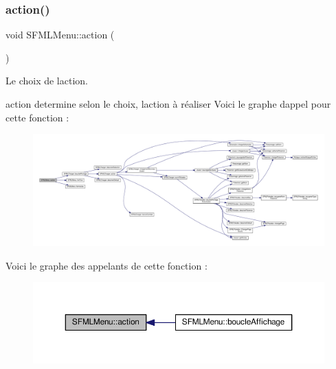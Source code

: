 \subsubsection{\texorpdfstring{action()}{action()}}
{\footnotesize\ttfamily void S\+F\+M\+L\+Menu\+::action (\begin{DoxyParamCaption}{ }\end{DoxyParamCaption})\hspace{0.3cm}{\ttfamily [private]}}



Le choix de l\textquotesingle{}action. 

action determine selon le choix, l\textquotesingle{}action à réaliser Voici le graphe d\textquotesingle{}appel pour cette fonction \+:\nopagebreak
\begin{figure}[H]
\begin{center}
\leavevmode
\includegraphics[width=350pt]{class_s_f_m_l_menu_abbed99b9e874fd8e3f40a7b748576182_cgraph}
\end{center}
\end{figure}
Voici le graphe des appelants de cette fonction \+:\nopagebreak
\begin{figure}[H]
\begin{center}
\leavevmode
\includegraphics[width=350pt]{class_s_f_m_l_menu_abbed99b9e874fd8e3f40a7b748576182_icgraph}
\end{center}
\end{figure}
\mbox{\label{class_s_f_m_l_menu_ab7eeb1a042f076ec28ce301c1d8d3660}} 
